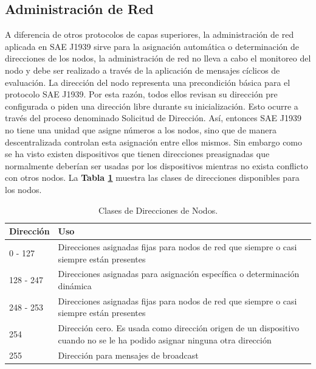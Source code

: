 \subsection{Administración de Red}
A diferencia de otros protocolos de capas superiores, la administración de red aplicada en SAE J1939 sirve para la asignación automática o determinación de direcciones de los nodos, la administración de red no lleva a cabo el monitoreo del nodo y debe ser realizado a través de la aplicación de mensajes cíclicos de evaluación.
La dirección del nodo representa una precondición básica para el protocolo SAE J1939. Por esta razón, todos ellos revisan su dirección pre configurada o piden una dirección libre durante su inicialización.  Esto ocurre a través del proceso denominado Solicitud de Dirección. Así, entonces SAE J1939 no tiene una unidad que asigne números a los nodos, sino que de manera descentralizada controlan esta asignación entre ellos mismos.
Sin embargo como se ha visto existen dispositivos que tienen direcciones preasignadas que normalmente deberían ser usadas por los dispositivos mientras no exista conflicto con otros nodos. La \textbf{Tabla \ref{nodos}} muestra las clases de direcciones disponibles para los nodos. 


\begin{table}[htb]
\begin{center}
\begin{tabular} {p{2cm} p{9cm}}%
\toprule
Dirección & Uso  \\
\midrule
0 - 127 & Direcciones asignadas fijas para nodos de red que siempre o casi siempre están presentes \\ 
128 - 247 & Direcciones asignadas para asignación específica o determinación dinámica \\ 
248 - 253 & Direcciones asignadas fijas para nodos de red que siempre o casi siempre están presentes \\ 
254 & Dirección cero. Es usada como dirección origen de un dispositivo cuando no se le ha podido asignar ninguna otra dirección \\
255 & Dirección para mensajes de broadcast \\ %
\bottomrule
\end{tabular}
\caption{Clases de Direcciones de Nodos.}
\label{nodos}
\end{center}
\end{table}

